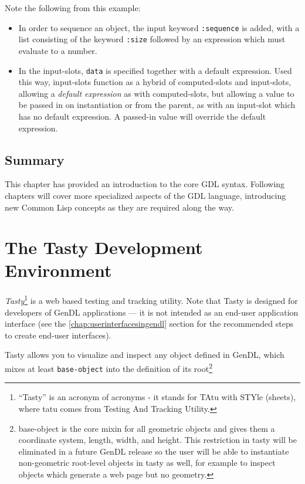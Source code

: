 \documentclass [11pt]{book}
\begin{document}
Note the following from this example:

\begin{itemize}

\item In order to sequence an object, the input keyword \texttt{:sequence} is added, with a list consisting of the keyword \texttt{:size} followed by an expression which must evaluate to a number.

\item In the input-slots, \texttt{data} is specified together with a default expression. Used this way, 
input-slots function as a hybrid of computed-slots and input-slots, allowing a \emph{default expression} as with computed-slots, but allowing a value to be passed in on 
instantiation or from the parent, as with an input-slot which has no default expression. 
A passed-in value will override the default expression.

\end{itemize}



\section{Summary}

\label{sec:summary}

This chapter has provided an introduction to the core GDL
syntax. Following chapters will cover more specialized aspects
of the GDL language, introducing new Common Lisp concepts as they are
required along the way.

\chapter{The Tasty Development Environment}

\label{chap:thetastydevelopmentenvironment}



\emph{Tasty}\footnote{``Tasty'' is an acronym of acronyms - it stands
for TAtu with STYle (sheets), where tatu comes from Testing And
Tracking Utility.} is a web based testing and tracking utility. Note that Tasty is
designed for developers of GenDL applications --- it is not intended
as an end-user application interface (see the 
\ref{chap:userinterfacesingendl} section for the recommended steps to create end-user interfaces).



Tasty allows you to visualize and inspect any object defined in GenDL,
which mixes at least \texttt{base-object} into the definition of its root\footnote{base-object is the core mixin for all geometric
objects and gives them a coordinate system, length, width, and
height. This restriction in tasty will be eliminated in a future GenDL
release so the user will be able to instantiate non-geometric
root-level objects in tasty as well, for example to inspect objects
which generate a web page but no geometry.}
\end{document}

